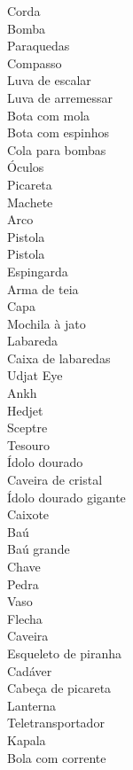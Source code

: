\begin{description}
    \item[Corda]
    \item[Bomba]
    \item[Paraquedas]
    \item[Compasso]
    \item[Luva de escalar]
    \item[Luva de arremessar]
    \item[Bota com mola]
    \item[Bota com espinhos]
    \item[Cola para bombas]
    \item[Óculos]
    \item[Picareta]
    \item[Machete]
    \item[Arco]
    \item[Pistola]
    \item[Pistola]
    \item[Espingarda]
    \item[Arma de teia]
    \item[Capa]
    \item[Mochila à jato]
    \item[Labareda]
    \item[Caixa de labaredas]
    \item[Udjat Eye]
    \item[Ankh]
    \item[Hedjet]
    \item[Sceptre]
    \item[Tesouro]
    \item[Ídolo dourado]
    \item[Caveira de cristal]
    \item[Ídolo dourado gigante]
    \item[Caixote]
    \item[Baú]
    \item[Baú grande]
    \item[Chave]
    \item[Pedra]
    \item[Vaso]
    \item[Flecha]
    \item[Caveira]
    \item[Esqueleto de piranha]
    \item[Cadáver]
    \item[Cabeça de picareta]
    \item[Lanterna]
    \item[Teletransportador]
    \item[Kapala]
    \item[Bola com corrente]
\end{description}
